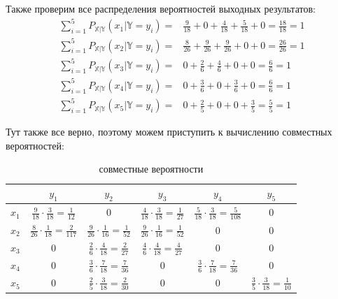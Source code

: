 \documentclass[a4paper,12pt]{article}
\begin{document}
  Также проверим все распределения вероятностей выходных результатов:
  \begin{equation}
    \begin{aligned}
      \sum\limits_{i = 1}^5P_{\mathbb{X}|\mathbb{Y}}(x_1|\mathbb{Y} = y_i) =&
      \frac{9}{18} + 0 + \frac{4}{18} + \frac{5}{18} + 0 = \frac{18}{18} = 1 \\
      \sum\limits_{i = 1}^5P_{\mathbb{X}|\mathbb{Y}}(x_2|\mathbb{Y} = y_i) =&
      \frac{8}{26} + \frac{9}{26} + \frac{9}{26} + 0 + 0 = \frac{26}{26} = 1 \\
      \sum\limits_{i = 1}^5P_{\mathbb{X}|\mathbb{Y}}(x_3|\mathbb{Y} = y_i) =&
      0 + \frac{2}{6} + \frac{4}{6} + 0 + 0 = \frac{6}{6} = 1 \\
      \sum\limits_{i = 1}^5P_{\mathbb{X}|\mathbb{Y}}(x_4|\mathbb{Y} = y_i) =&
      0 + \frac{3}{6} + 0 + \frac{3}{6} + 0 = \frac{6}{6} = 1 \\
      \sum\limits_{i = 1}^5P_{\mathbb{X}|\mathbb{Y}}(x_5|\mathbb{Y} = y_i) =&
      0 + \frac{2}{5} + 0 + 0 + \frac{3}{5} = \frac{5}{5} = 1
    \end{aligned}
  \end{equation}

  Тут также все верно, поэтому можем приступить к вычислению совместных вероятностей:
  \begin{table}[H]
    \centering
    \renewcommand{\arraystretch}{1.5}
    \begin{tabular}{| c | c | c | c | c | c |}
      \hline
      \cellcolor{gray}{} & $y_1$ & $y_2$ & $y_3$ & $y_4$ & $y_5$ \\
      \hline
      $x_1$ & $\frac{9}{18} \cdot \frac{3}{18} = \frac{1}{12}$ & $0$ &
      $\frac{4}{18} \cdot \frac{3}{18} = \frac{1}{27}$ &
      $\frac{5}{18} \cdot \frac{3}{18} = \frac{5}{108}$ & $0$ \\
      \hline
      $x_2$ & $\frac{8}{26} \cdot \frac{1}{18} = \frac{2}{117}$ &
      $\frac{9}{26} \cdot \frac{1}{16} = \frac{1}{52}$ &
      $\frac{9}{26} \cdot \frac{1}{16} = \frac{1}{52}$ & $0$ & $0$ \\
      \hline
      $x_3$ & $0$ & $\frac{2}{6}\cdot \frac{4}{18} = \frac{2}{27}$ &
      $\frac{4}{6}\cdot \frac{4}{18} = \frac{4}{27}$ & $0$ & $0$ \\
      \hline
      $x_4$ & $0$ & $\frac{3}{6} \cdot \frac{7}{18} = \frac{7}{36}$ &
      $0$ & $\frac{3}{6} \cdot \frac{7}{18} = \frac{7}{36}$ & $0$ \\
      \hline
      $x_5$ & $0$ & $\frac{2}{5} \cdot \frac{3}{18} = \frac{2}{30}$ &
      $0$ & $0$ & $\frac{3}{5} \cdot \frac{3}{18} = \frac{1}{10}$ \\
      \hline
    \end{tabular}
    \caption{совместные вероятности}
  \end{table}
\end{document}
